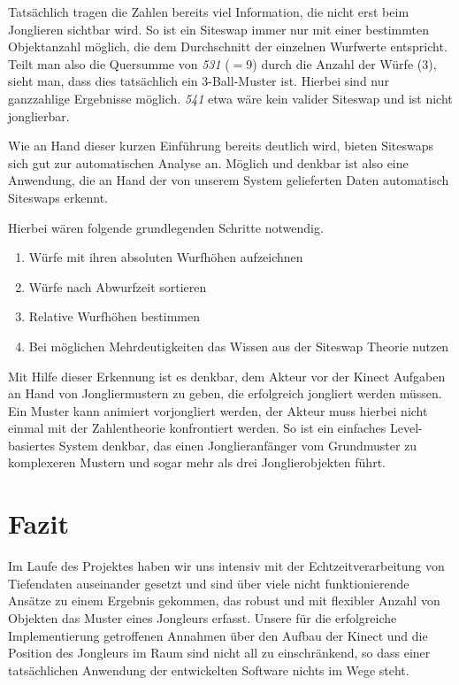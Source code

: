 \documentclass[12pt,a4paper,ngerman]{scrartcl}
\begin{document}
Tatsächlich tragen die Zahlen bereits viel Information, die nicht erst beim
Jonglieren sichtbar wird. So ist ein Siteswap immer nur mit einer bestimmten
Objektanzahl möglich, die dem Durchschnitt der einzelnen Wurfwerte entspricht.
Teilt man also die Quersumme von \textit{531} ($= 9$) durch die Anzahl der Würfe
($3$), sieht man, dass dies tatsächlich ein 3-Ball-Muster ist. Hierbei sind nur
ganzzahlige Ergebnisse möglich. \textit{541} etwa wäre kein valider Siteswap und ist
nicht jonglierbar.

Wie an Hand dieser kurzen Einführung bereits deutlich wird, bieten Siteswaps sich gut
zur automatischen Analyse an. Möglich und denkbar ist also eine Anwendung, die an
Hand der von unserem System gelieferten Daten automatisch Siteswaps erkennt.

Hierbei wären folgende grundlegenden Schritte notwendig.

\begin{enumerate}
\item Würfe mit ihren absoluten Wurfhöhen aufzeichnen
\item Würfe nach Abwurfzeit sortieren
\item Relative Wurfhöhen bestimmen
\item Bei möglichen Mehrdeutigkeiten das Wissen aus der Siteswap Theorie nutzen
\end{enumerate}

Mit Hilfe dieser Erkennung ist es denkbar, dem Akteur vor der Kinect Aufgaben an Hand
von Jongliermustern zu geben, die erfolgreich jongliert werden müssen. Ein Muster
kann animiert vorjongliert werden, der Akteur muss hierbei nicht einmal mit der
Zahlentheorie konfrontiert werden. So ist ein einfaches Level-basiertes System
denkbar, das einen Jonglieranfänger vom Grundmuster zu komplexeren Mustern und
sogar mehr als drei Jonglierobjekten führt.

\section{Fazit}

Im Laufe des Projektes haben wir uns intensiv mit der Echtzeitverarbeitung von
Tiefendaten auseinander gesetzt und sind über viele nicht funktionierende
Ansätze zu einem Ergebnis gekommen, das robust und mit flexibler Anzahl von
Objekten das Muster eines Jongleurs erfasst. Unsere für die erfolgreiche
Implementierung getroffenen Annahmen über den Aufbau der Kinect und die Position des
Jongleurs im Raum sind nicht all zu einschränkend, so dass einer tatsächlichen
Anwendung der entwickelten Software nichts im Wege steht.
\end{document}
